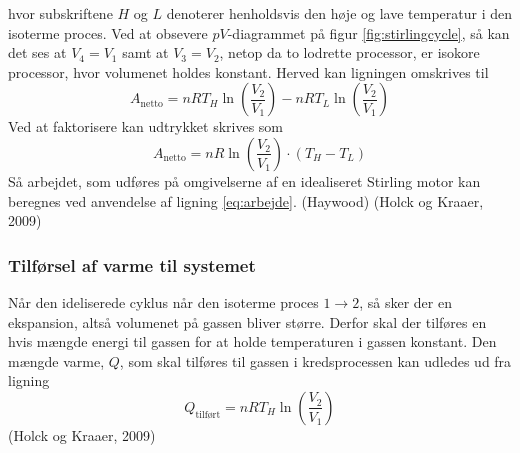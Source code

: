 \documentclass[SRC.tex]{subfiles}
\begin{document}
	hvor subskriftene \(H\) og \(L\) denoterer henholdsvis den høje og lave temperatur i den isoterme
	proces. Ved at obsevere \(pV\)-diagrammet på figur \ref{fig:stirlingcycle}, så kan det ses at \(V_4 = V_1\) samt 
	at \(V_3 = V_2\), netop da to lodrette processor, er isokore processor, hvor volumenet holdes konstant. Herved kan ligningen omskrives til
	\begin{equation}
	A_{\text{netto}} = nRT_H\ln\left(\frac{V_2}{V_1}\right)-nRT_L\ln\left(\frac{V_2}{V_1}\right)
	\end{equation}
	Ved at faktorisere kan udtrykket skrives som
	\begin{equation}
		A_{\text{netto}}= nR\ln\left(\frac{V_2}{V_1}\right)\cdot (T_H - T_L)
		\label{eq:arbejde}
	\end{equation}
	Så arbejdet, som udføres på omgivelserne af en idealiseret Stirling motor kan beregnes ved anvendelse af ligning \eqref{eq:arbejde}.
	(Haywood) (Holck og Kraaer, 2009) 
	
	\subsubsection{Tilførsel af varme til systemet}
	Når den ideliserede cyklus når den isoterme proces \(1 \rightarrow 2\), så sker der en 
	ekspansion, altså volumenet på gassen bliver større. Derfor skal der tilføres en hvis mængde 
	energi til gassen for at holde temperaturen i gassen konstant. Den mængde varme, \(Q\), som skal tilføres til gassen i kredsprocessen kan udledes ud fra ligning
	\begin{equation}
		Q_{\text{tilført}} = nRT_H\ln\left(\frac{V_2}{V_1}\right)
		\label{eq:varme}
	\end{equation}
	(Holck og Kraaer, 2009) 
	 
\end{document}
